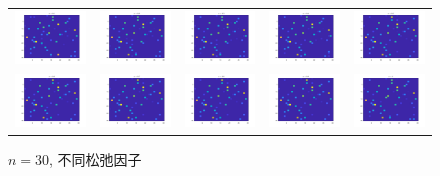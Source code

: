 \documentclass[UTF8,10.5pt,a4paper]{ctexart}
\theoremstyle{definition}
\theoremstyle{definition}
\begin{document}
\begin{figure}[htbp]
	\renewcommand{\captionfont}{\small}
	\centering
	\begin{tabular}{@{}ccccc@{}}
		\includegraphics[width=.18\textwidth]{alpha1n30.jpg} & 
		\includegraphics[width=.18\textwidth]{alpha2n30.jpg} & 
		\includegraphics[width=.18\textwidth]{alpha3n30.jpg} & 
		\includegraphics[width=.18\textwidth]{alpha4n30.jpg} & 
		\includegraphics[width=.18\textwidth]{alpha5n30.jpg}\\
		\includegraphics[width=.18\textwidth]{alpha6n30.jpg} & 
		\includegraphics[width=.18\textwidth]{alpha7n30.jpg} &
		\includegraphics[width=.18\textwidth]{alpha8n30.jpg} & 
		\includegraphics[width=.18\textwidth]{alpha9n30.jpg} & 
		\includegraphics[width=.18\textwidth]{alpha10n30.jpg}
	\end{tabular}
	\caption{$n=30$, 不同松弛因子}
	\label{alphan30figure}
\end{figure}
\end{document}
